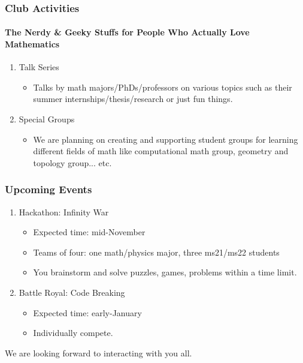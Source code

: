 \documentclass[10pt, aspectratio=43,leqno]{beamer}
\begin{document}
\begin{frame}
  \frametitle{Club Activities}
  \framesubtitle{The Nerdy \& Geeky Stuffs for People Who Actually Love Mathematics}
  \pause
\begin{enumerate}
\item\label{item:6} Talk Series
\begin{itemize}
\item Talks by math majors/PhDs/professors on various topics such as their summer internships/thesis/research or just fun things.
\end{itemize}
\pause 
\item\label{item:7} Special Groups
\begin{itemize}
\item We are planning on creating and supporting student groups for learning different fields of math like computational math group, geometry and topology group... etc.
\end{itemize}
\end{enumerate}
\end{frame}

\begin{frame}
  \frametitle{Upcoming Events}
  \pause
\begin{enumerate}
\item\label{item:8} Hackathon: Infinity War 
\begin{itemize}
\item Expected time: mid-November 
\item Teams of four: one math/physics major, three ms21/ms22 students
\item You brainstorm and solve puzzles, games, problems within a time limit.
\end{itemize}
\pause
\item\label{item:9} Battle Royal: Code Breaking 
\begin{itemize} 
\item Expected time: early-January
\item Individually compete.
\end{itemize}
\end{enumerate}
\end{frame}

\begin{frame}
  We are looking forward to interacting with you all.
\end{frame}
\end{document}

